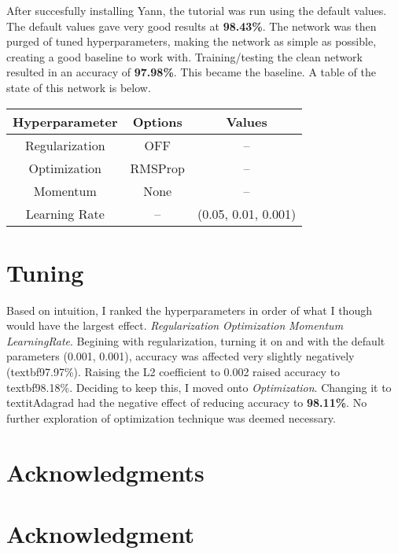 \documentclass[conference,compsoc]{IEEEtran}
\begin{document}
 After succesfully installing Yann, the tutorial was run using the default values. The default values gave very good results at \textbf{98.43\%}. The network was then purged of tuned hyperparameters, making the network as simple as possible, creating a good baseline to work with. Training/testing the clean network resulted in an accuracy of \textbf{97.98\%}. This became the baseline. A table of the state of this network is below. 
 
 \renewcommand{\arraystretch}{1.1}
 \begin{center}
   \begin{tabular}{ | c | c | c | }
     \hline
     \textbf{Hyperparameter} & \textbf{Options} & \textbf{Values} \\ \hline
     Regularization & OFF & -- \\ \hline
     Optimization & RMSProp & -- \\ \hline
     Momentum &  None &  -- \\ \hline
     Learning Rate & -- & (0.05, 0.01, 0.001)  \\ \hline
   \end{tabular}
 \end{center}


\section{Tuning}
%
Based on intuition, I ranked the hyperparameters in order of what I though would have the largest effect.
\textit{Regularization} \textit{Optimization} \textit{Momentum} \textit{LearningRate}. Begining with regularization, turning it on and with the default parameters (0.001, 0.001), accuracy was affected very slightly negatively (textbf{97.97\%}). Raising the L2 coefficient to 0.002 raised accuracy to textbf{98.18\%}. Deciding to keep this, I moved onto \textit{Optimization}. Changing it to textit{Adagrad} had the negative effect of reducing accuracy to \textbf{98.11\%}. No further exploration of optimization technique was deemed necessary. 

\ifCLASSOPTIONcompsoc
  \section*{Acknowledgments}
\else
  \section*{Acknowledgment}
\fi
\end{document}
